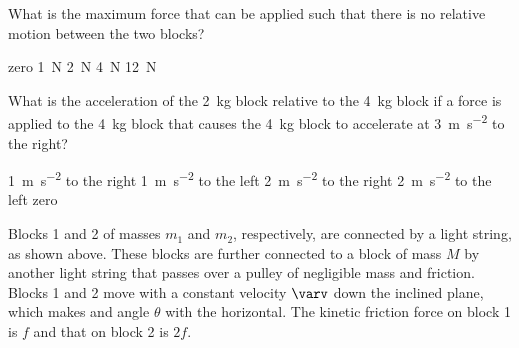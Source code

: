 \documentclass{../../../oss-ap12ibhl-print}
\begin{document}
\begin{questions}
  \question What is the maximum force that can be applied such that there is no
  relative motion between the two blocks?
  \begin{choices}
    \choice zero
    \choice\SI{1}{\newton}
    \choice\SI{2}{\newton}
    \choice\SI{4}{\newton}
    \choice\SI{12}{\newton}
  \end{choices}
  \label{stacked1}
  
  \question What is the acceleration of the \SI{2}{\kilo\gram} block relative
  to the \SI{4}{\kilo\gram} block if a force is applied to the
  \SI{4}{\kilo\gram} block that causes the \SI{4}{\kilo\gram} block to
  accelerate at \SI{3}{\metre\per\second\squared} to the right?
  \begin{choices}
    \choice\SI{1}{\metre\per\second\squared} to the right
    \choice\SI{1}{\metre\per\second\squared} to the left
    \choice\SI{2}{\metre\per\second\squared} to the right
    \choice\SI{2}{\metre\per\second\squared} to the left
    \choice zero
  \end{choices}
  \label{stacked2}
  \newpage


  \question Blocks 1 and 2 of masses $m_1$ and $m_2$, respectively, are
  connected by a light string, as shown above. These blocks are further
  connected to a block of mass $M$ by another light string that passes over a
  pulley of negligible mass and friction. Blocks 1 and 2 move with a constant
  velocity $\varv$ down the inclined plane, which makes and angle $\theta$ with
  the horizontal. The kinetic friction force on block 1 is $f$ and that on
  block 2 is $2f$.
\end{questions}
\end{document}
